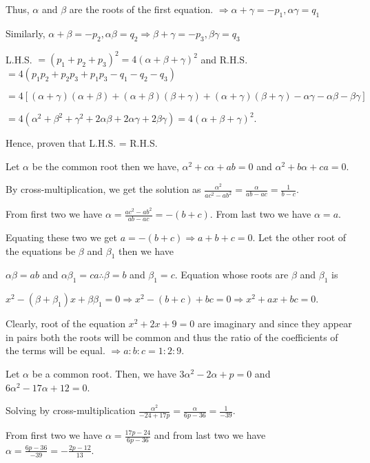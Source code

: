   Thus, $\alpha$ and $\beta$ are the roots of the first equation. $\Rightarrow \alpha + \gamma = -p_1, \alpha\gamma = q_1$

  Similarly, $\alpha + \beta = -p_2, \alpha\beta = q_2\Rightarrow \beta + \gamma = -p_3, \beta\gamma = q_3$

  L.H.S. $= (p_1 + p_2 + p_3)^2 = 4(\alpha + \beta + \gamma)^2$ and R.H.S. $= 4(p_1p_2 + p_2p_3 + p_1p_3 - q_1 - q_2 - q_3)$

  $= 4[(\alpha + \gamma)(\alpha + \beta) + (\alpha + \beta)(\beta + \gamma) + (\alpha + \gamma)(\beta + \gamma) -
    \alpha\gamma - \alpha\beta - \beta\gamma]$

  $= 4(\alpha^2 + \beta^2 + \gamma^2 + 2\alpha\beta + 2\alpha\gamma + 2\beta\gamma) = 4(\alpha + \beta + \gamma)^2$.

  Hence, proven that L.H.S. = R.H.S.
\item Let $\alpha$ be the common root then we have, $\alpha^2 + c\alpha + ab = 0$ and $\alpha^2 + b\alpha + ca = 0$.

  By cross-multiplication, we get the solution as $\frac{\alpha^2}{ac^2 - ab^2} = \frac{\alpha}{ab - ac} =
  \frac{1}{b - c}$.

  From first two we have $\alpha = \frac{ac^2 - ab^2}{ab - ac} = -(b + c)$. From last two we have $\alpha = a$.

  Equating these two we get $a = -(b + c) \Rightarrow a + b + c = 0$. Let the other root of the equations be
  $\beta$ and $\beta_1$ then we have

  $\alpha\beta = ab$ and $\alpha\beta_1 = ca\therefore \beta = b$ and $\beta_1 = c$. Equation whose roots are
  $\beta$ and $\beta_1$ is

  $x^2 - (\beta + \beta_1)x + \beta\beta_1 = 0 \Rightarrow x^2 -(b + c) + bc = 0 \Rightarrow x^2 + ax + bc =
  0$.
\item Clearly, root of the equation $x^2 + 2x + 9 = 0$ are imaginary and since they appear in pairs both the
  roots will be common and thus the ratio of the coefficients of the terms will be equal. $\Rightarrow a :
  b: c = 1 : 2 : 9$.
\item Let $\alpha$ be a common root. Then, we have $3\alpha^2 -2\alpha + p = 0$ and $6\alpha^2 - 17\alpha + 12 = 0$.

  Solving by cross-multiplication $\frac{\alpha^2}{-24 + 17p} = \frac{\alpha}{6p - 36} = \frac{1}{-39}$.

  From first two we have $\alpha = \frac{17p - 24}{6p - 36}$ and from last two we have $\alpha = \frac{6p -
    36}{-39} = -\frac{2p - 12}{13}$.

